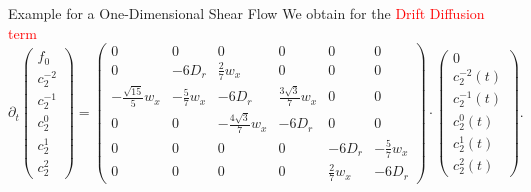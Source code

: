 \begin{frame}{Example for a One-Dimensional Shear Flow}
	\scriptsize
     We obtain for the \textcolor{red}{Drift Diffusion term} \\
	
	\begin{equation*}
		\partial_t \left(\begin{array}{c}
			f_0 \\
			c_2^{-2} \\
			c_2^{-1} \\
			c_2^0 \\
			c_2^1 \\
			c_2^2
		\end{array}\right)  = \begin{pmatrix}
			0 & 0 & 0 & 0 & 0 & 0 \\
			0 & -6D_r & \frac{2}{7}w_x & 0 & 0 & 0 \\
			-\frac{\sqrt{15}}{5}w_x & -\frac{5}{7}w_x & -6D_r & \frac{3\sqrt{3}}{7}w_x & 0 & 0 \\
			0 & 0 & -\frac{4\sqrt{3}}{7}w_x & -6D_r & 0 & 0 \\
			0 & 0 & 0 & 0 & -6D_r & -\frac{5}{7} w_x\\
			0 & 0 & 0 & 0 & \frac{2}{7}w_x & -6D_r
		\end{pmatrix} \cdot
		\left(\begin{array}{c}
			0 \\
			c^{-2}_2(t) \\
			c_2^{-1}(t) \\
			c_2^0(t) \\
			c_2^1(t) \\
			c_2^2(t)
		\end{array}\right).
	\end{equation*}
\end{frame}

